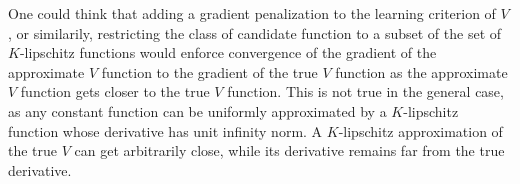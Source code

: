 One could think that adding a gradient penalization to the learning criterion of
$V$, or similarily, restricting the class of candidate function to a subset of 
the set of $K$-lipschitz functions would enforce convergence of the gradient of the
approximate $V$ function to the gradient of the true $V$ function as the approximate
$V$ function gets closer to the true $V$ function. This is not true
in the general case, as any constant function can be uniformly approximated by a
$K$-lipschitz function whose derivative has unit infinity norm. A $K$-lipschitz
approximation of the true $V$ can get arbitrarily close, while its derivative remains
far from the true derivative.
